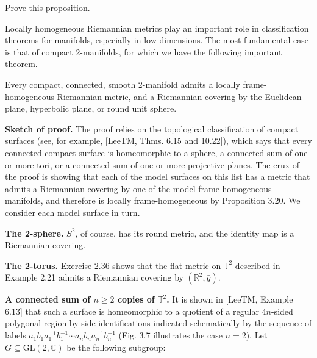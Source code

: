 \begin{exercise}
\label{exer:prove-locally-homogeneous-covering}
Prove this proposition.
\end{exercise}

Locally homogeneous Riemannian metrics play an important role in classification theorems for manifolds, especially in low dimensions. The most fundamental case is that of compact 2-manifolds, for which we have the following important theorem.

\begin{theorem}
\label{thm:uniformization-compact-surfaces}
Every compact, connected, smooth 2-manifold admits a locally frame-homogeneous Riemannian metric, and a Riemannian covering by the Euclidean plane, hyperbolic plane, or round unit sphere.
\end{theorem}

\noindent
\textbf{Sketch of proof.} The proof relies on the topological classification of compact surfaces (see, for example, [LeeTM, Thms. 6.15 and 10.22]), which says that every
connected compact surface is homeomorphic to a sphere, a connected sum of one or more tori, or a connected sum of one or more projective planes. The crux of the proof is showing that each of the model surfaces on this list has a metric that admits a Riemannian covering by one of the model frame-homogeneous manifolds, and therefore is locally frame-homogeneous by Proposition 3.20. We consider each model surface in turn.



\noindent\textbf{The 2-sphere.} $S^2$, of course, has its round metric, and the identity map is a Riemannian covering.

\noindent\textbf{The 2-torus.} Exercise 2.36 shows that the flat metric on $\mathbb{T}^2$ described in Example 2.21 admits a Riemannian covering by $(\mathbb{R}^2, \bar{g})$.

\noindent\textbf{A connected sum of $n \geq 2$ copies of $\mathbb{T}^2$.} It is shown in [LeeTM, Example 6.13] that such a surface is homeomorphic to a quotient of a regular $4n$-sided polygonal region by side identifications indicated schematically by the sequence of labels
$a_1 b_1 a_1^{-1} b_1^{-1} \cdots a_n b_n a_n^{-1} b_n^{-1}$ (Fig. 3.7 illustrates the case $n = 2$). Let $G \subseteq \text{GL}(2, \mathbb{C})$ be the following subgroup:

